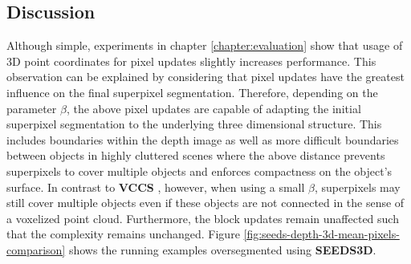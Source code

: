 \subsection{Discussion}

Although simple, experiments in chapter \ref{chapter:evaluation} show that usage of 3D point coordinates for pixel updates slightly increases performance. This observation can be explained by considering that pixel updates have the greatest influence on the final superpixel segmentation. Therefore, depending on the parameter $\beta$, the above pixel updates are capable of adapting the initial superpixel segmentation to the underlying three dimensional structure. This includes boundaries within the depth image as well as more difficult boundaries between objects in highly cluttered scenes where the above distance prevents superpixels to cover multiple objects and enforces compactness on the object's surface. In contrast to \textbf{VCCS} \cite{PaponAbramovSchoelerWoergoetter:2013}, however, when using a small $\beta$, superpixels may still cover multiple objects even if these objects are not connected in the sense of a voxelized point cloud. Furthermore, the block updates remain unaffected such that the complexity remains unchanged. Figure \ref{fig:seeds-depth-3d-mean-pixels-comparison} shows the running examples oversegmented using \textbf{SEEDS3D}.

